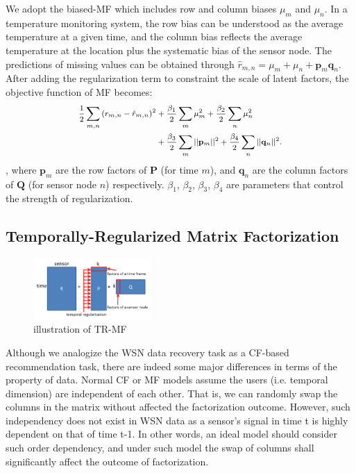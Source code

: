We adopt the biased-MF which includes row and column biases $\mu_m$ and $\mu_n$. %
In a temperature monitoring system, the row bias can be understood as the average temperature at a given time, and the column bias reflects the average temperature at the location plus the systematic bias of the sensor node.
The predictions of missing values can be obtained through $\hat{r}_{m,n} = \mu_m + \mu_n + \mathbf{p}_m \mathbf{q}_n$.
After adding the regularization term to constraint the scale of latent factors, the objective function of MF becomes:
\begin{equation*}\small \begin{aligned}
\frac{1}{2}\sum_{m,n}{(r_{m,n} - \hat{r}_{m,n})}^2 & + \frac{\beta_1}{2}\sum_m{\mu_m^2} + \frac{\beta_2}{2}\sum_n{\mu_n^2}\\
& + \frac{\beta_3}{2}\sum_m{||\mathbf{p}_m||^2} + \frac{\beta_4}{2}\sum_n{||\mathbf{q}_n||^2}.
\end{aligned}\end{equation*}
, where $\mathbf{p}_m$ are the row factors of $\mathbf{P}$ (for time $m$), and $\mathbf{q}_n$ are the column factors of $\mathbf{Q}$ (for sensor node $n$) respectively.
$\beta_1$, $\beta_2$, $\beta_3$, $\beta_4$ are parameters that control the strength of regularization.

\subsection{Temporally-Regularized Matrix Factorization}
\begin{figure}[htbp]
	\centering
	\includegraphics[width=0.4\textwidth]{TRMF_illustration.png}
	\caption{illustration of TR-MF}
\end{figure}
Although we analogize the WSN data recovery task as a CF-based recommendation task, there are indeed some major differences in terms of the property of data.
Normal CF or MF models assume the users (i.e. temporal dimension) are independent of each other. That is, we can randomly swap the columns in the matrix without affected the factorization outcome. However, such independency does not exist in WSN data as a sensor's signal in time t is highly dependent on that of time t-1. In other words, an ideal model should consider such order dependency, and under such model the swap of columns shall significantly affect the outcome of factorization.

